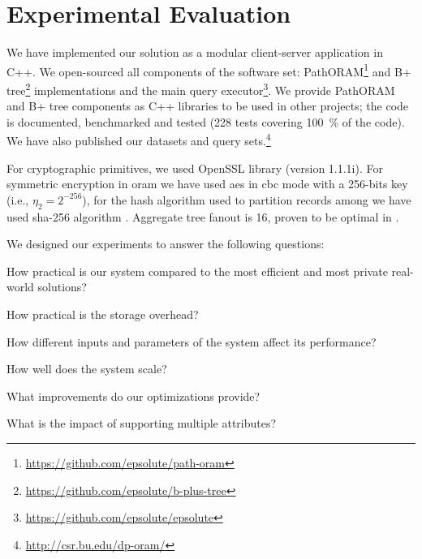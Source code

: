 \section{Experimental Evaluation}\label{section:range-persistent:experiments}

	We have implemented our solution as a modular client-server application in C++.
	We open-sourced all components of the software set: PathORAM\footnote{\url{https://github.com/epsolute/path-oram}} and B+ tree\footnote{\url{https://github.com/epsolute/b-plus-tree}} implementations and the main query executor\footnote{\url{https://github.com/epsolute/epsolute}}.
	We provide PathORAM and B+ tree components as C++ libraries to be used in other projects; the code is documented, benchmarked and tested (228 tests covering \SI{100}{\percent} of the code).
	We have also published our datasets and query sets.\footnote{\url{http://csr.bu.edu/dp-oram/}}

	For cryptographic primitives, we used OpenSSL library (version 1.1.1i).
	For symmetric encryption in \acrshort{oram} we have used \acrshort{aes} in \acrshort{cbc} mode \cite{aes-nist,nist-modes} with a 256-bits key (i.e., $\eta_2 = 2^{-256}$), for the hash algorithm  used to partition records among  we have used \acrshort{sha}-256 algorithm \cite{nist-hash}.
	Aggregate tree fanout \fanout{} is 16, proven to be optimal in \cite{hierarchical-methods-for-dp}.

	We designed our experiments to answer the following questions:
	\newlength{\questionLength}
	\settowidth{\questionLength}{Question-5}
	\begin{description}[
		font=\bfseries,
		leftmargin=\dimexpr\questionLength+1.0em\relax,
		labelindent=0pt,
		labelwidth=\questionLength%
	]
		\item[Question-1\label{item:question-practicality}] How practical is our system compared to the most efficient and most private real-world solutions?
		\item[Question-2\label{item:question-storage}] How practical is the storage overhead?
		\item[Question-3\label{item:question-parameters}] How different inputs and parameters of the system affect its performance?
		\item[Question-4\label{item:question-scalability}] How well does the system scale?
		\item[Question-5\label{item:question-optimizations}] What improvements do our optimizations provide?
		\item[Question-6\label{item:question-attributes}] What is the impact of supporting multiple attributes?
	\end{description}

